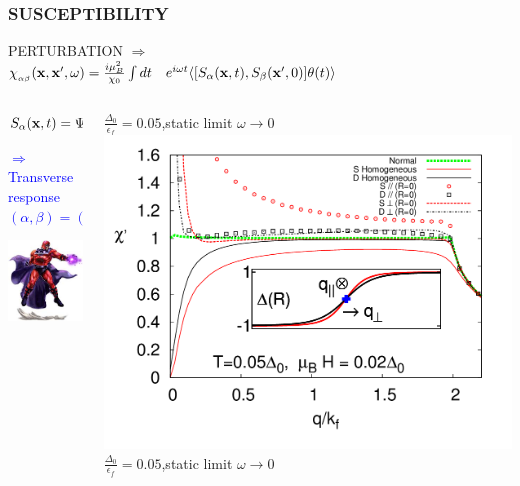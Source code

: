 \documentclass[amssymb,amsmath]{beamer}
\newcommand{\blue}{\textcolor{blue}}
\newcommand{\red}{\textcolor{red}}
\newcommand\Fontvi{\fontsize{9}{9}\selectfont}
\begin{document}
\begin{frame} \frametitle{SUSCEPTIBILITY} 
PERTURBATION $\Rightarrow\,\,$  \\
$\chi_{_{\alpha\beta}}({\bf x},{\bf x}',\omega) = \frac{i\mu_B^2}{\chi_0}\int dt \quad e^{i\omega t}\langle [S_\alpha({\bf x},t), S_\beta({\bf x}',0)]\theta(t) \rangle$ 
\begin{columns}
\begin{column}{0.42\textwidth}
$S_\alpha({\bf x},t) = \Psi^\dagger_\mu({\bf x},t) \sigma^{\alpha}_{\mu\nu}  \Psi^\dagger_\nu({\bf x},t)$

\blue{\Fontvi $\Rightarrow$Transverse response \\\hspace{1cm}$(\alpha,\beta) = (x,x)\, or\, (y,y)$} \\

{\fbox{\red{$\chi(\vR,\vq) = \int d\vr e^{-i\vq\cdot\vr} \chi(\vR,\vr)$}}}

\includegraphics[scale=0.419]{./figures/perp_magneto.jpg}
\end{column}
\begin{column}{0.6\textwidth}
\centering
$\frac{\Delta_0}{\epsilon_f} = 0.05$,\quad static limit $\omega \rightarrow 0$
\includegraphics[scale=0.22]{./figures_3/fig_4/Fig4_3.png}\\
$\frac{\Delta_0}{\epsilon_f} = 0.05$,\quad static limit $\omega \rightarrow 0$
\end{column}
\end{columns}
\end{frame}
\end{document}
